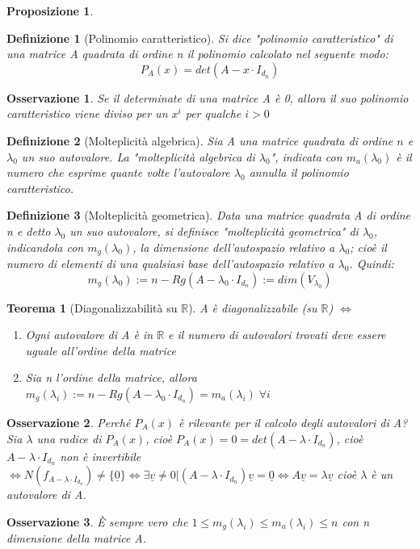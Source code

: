 \documentclass[12pt]{article}
\newenvironment{para}{\begin{adjustwidth}{13mm}{}}{\end{adjustwidth}}
\newtheorem{Definizione}{Definizione}[subsection]
\newtheorem{Teorema}{Teorema}[subsection]
\newtheorem{Proposizione}{Proposizione}[subsection]
\newtheorem{Osservazione}{Osservazione}[subsection]
\begin{document}
\begin{para}
\begin{Proposizione}
\end{Proposizione}
\begin{Definizione}[Polinomio caratteristico]
Si dice "polinomio caratteristico" di una matrice A quadrata di ordine n il polinomio calcolato nel seguente modo: $$P_A(x)=det(A-x \cdot I_{d_{n}})$$
\end{Definizione}
\begin{Osservazione}
    Se il determinate di una matrice A è 0, allora il suo polinomio caratteristico viene diviso per un $x^i$ per qualche $i > 0$
\end{Osservazione}
\begin{Definizione}[Molteplicità algebrica]
Sia A una matrice quadrata di ordine $n$ e $\lambda_0$ un suo autovalore. La "molteplicità algebrica di $\lambda_0$", indicata con $m_a(\lambda_0)$ è il numero che esprime quante volte l'autovalore $\lambda_0$ annulla il polinomio caratteristico.
\end{Definizione}
\begin{Definizione}[Molteplicità geometrica]
Data una matrice quadrata A di ordine n e detto $\lambda_0$ un suo autovalore, si definisce "molteplicità geometrica" di $\lambda_0$, indicandola con $m_g(\lambda_0)$, la dimensione dell'autospazio relativo a $\lambda_0$; cioè il numero di elementi di una qualsiasi base dell'autospazio relativo a $\lambda_0$. Quindi: $$m_g(\lambda_0) := n - Rg(A-\lambda_0 \cdot I_{d_n}) := dim(V_{\lambda_0})$$
\end{Definizione}
\newpage
\begin{Teorema}[Diagonalizzabilità su $\mathbb{R}$]
A è diagonalizzabile (su $\mathbb{R}$) $\Leftrightarrow$ \begin{enumerate}
    \item Ogni autovalore di A è in $\mathbb{R}$ e il numero di autovalori trovati deve essere uguale all'ordine della matrice
    \item Sia n l'ordine della matrice, allora $m_g(\lambda_i) := n-Rg(A-\lambda_0 \cdot I_{d_n}) = m_a(\lambda_i) \; \forall i$
\end{enumerate}
\end{Teorema}
\begin{Osservazione}
    Perché $P_A(x)$ è rilevante per il calcolo degli autovalori di A? Sia $\lambda$ una radice di $P_A(x)$, cioè $P_A(x) = 0 = det(A-\lambda \cdot I_{d_n})$, cioè $A-\lambda \cdot I_{d_n}$ non è invertibile $\Leftrightarrow N(f_{A-\lambda \cdot I_{d_n}}) \neq \{\underline{0}\} \Leftrightarrow \exists \underline{v} \neq 0 | (A-\lambda \cdot I_{d_n})\underline{v} = \underline{0} \Leftrightarrow A\underline{v} = \lambda \underline{v}$ cioè $\lambda$ è un autovalore di A.
\end{Osservazione}
\begin{Osservazione}
    È sempre vero che $1 \leq m_g(\lambda_i) \leq m_a(\lambda_i) \leq n$ con n dimensione della matrice A.
\end{Osservazione}

\end{para}
\end{document}
